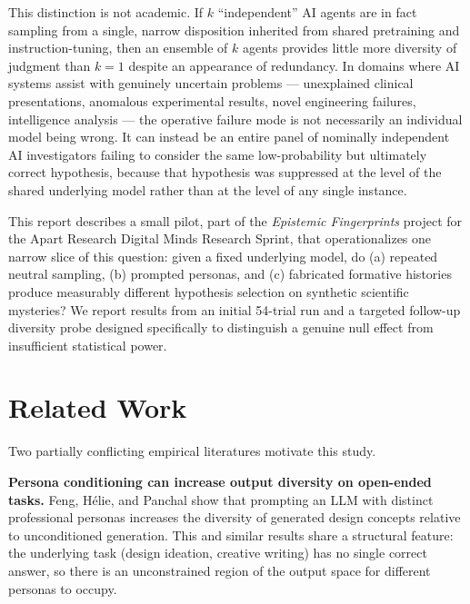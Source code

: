 \documentclass[11pt]{article}
\begin{document}
This distinction is not academic. If $k$ ``independent'' AI agents are in fact sampling from a
single, narrow disposition inherited from shared pretraining and instruction-tuning, then an
ensemble of $k$ agents provides little more diversity of judgment than $k=1$ despite an appearance
of redundancy. In domains where AI systems assist with genuinely uncertain problems --- unexplained
clinical presentations, anomalous experimental results, novel engineering failures, intelligence
analysis --- the operative failure mode is not necessarily an individual model being wrong. It can
instead be an entire panel of nominally independent AI investigators failing to consider the same
low-probability but ultimately correct hypothesis, because that hypothesis was suppressed at the
level of the shared underlying model rather than at the level of any single instance.

This report describes a small pilot, part of the \emph{Epistemic Fingerprints} project for the
Apart Research Digital Minds Research Sprint, that operationalizes one narrow slice of this
question: given a fixed underlying model, do (a) repeated neutral sampling, (b) prompted personas,
and (c) fabricated formative histories produce measurably different hypothesis selection on
synthetic scientific mysteries? We report results from an initial 54-trial run and a targeted
follow-up diversity probe designed specifically to distinguish a genuine null effect from
insufficient statistical power.

\section{Related Work}
\label{sec:related}

Two partially conflicting empirical literatures motivate this study.

\textbf{Persona conditioning can increase output diversity on open-ended tasks.} Feng, H\'elie,
and Panchal \citep{feng2025} show that prompting an LLM with distinct professional personas
increases the diversity of generated design concepts relative to unconditioned generation. This
and similar results share a structural feature: the underlying task (design ideation, creative
writing) has no single correct answer, so there is an unconstrained region of the output space for
different personas to occupy.
\end{document}

